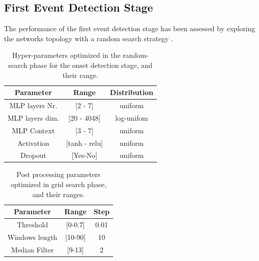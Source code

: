 \documentclass{article}
\begin{document}
\begin{sloppy}
\subsection{First Event Detection Stage}
The performance of the first event detection stage has been assessed by exploring the networks topology with a random search strategy \cite{bergstra2012random}.
\begin{table}[t]
  \caption{Hyper-parameters optimized in the random-search phase for the onset detection stage, and their range.}\label{tbl:hyper-params-mlp}
  \centering
  \footnotesize
  \begin{tabular} {|c | c | c|}
    \hline
    Parameter & Range & Distribution\\  
    \hline
    \hline                                     
    MLP layers Nr.  & [2 - 7]& uniform \\
    \hline                                     
    MLP layers dim. & [20 - 4048]& log-unifom \\
    \hline                                     
    MLP Context & [3 - 7] & uniform\\
    \hline
    Activation & [tanh - relu] & uniform\\
    \hline
    Dropout & [Yes-No] & uniform\\
    \hline
  \end{tabular}
\end{table}
%
\begin{table}[t]
  \caption{Post processing parameters optimized in grid search phase, and their ranges.}
  \label{tbl:post-proc-params-mlp}
  \centering
  \footnotesize
  \begin{tabular} {|c | c | c |}
    \hline
    Parameter     & Range  & Step\\  
    \hline
    \hline                                     
    Threshold  & [0-0.7] & 0.01\\
    \hline                                     
    Windows length & [10-90] & 10 \\
    \hline
    Median Filter & [9-13] & 2\\
    \hline                                       
  \end{tabular}
\end{table}


\end{sloppy}
\end{document}

